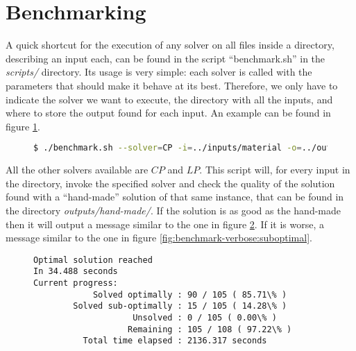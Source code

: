 \section{Benchmarking}
\label{sec:benchmarking}

A quick shortcut for the execution of any solver on all files inside a directory,
describing an input each, can be found in the script ``benchmark.sh''
in the \textit{scripts/} directory. Its usage is very simple: each solver is
called with the parameters that should make it behave at its best. Therefore,
we only have to indicate the solver we want to execute, the directory with
all the inputs, and where to store the output found for each input. An example
can be found in figure \ref{fig:benchmark-example}.

\begin{figure}[H]
\centering
\begin{lstlisting}[language=bash,basicstyle=\centering]
$ ./benchmark.sh --solver=CP -i=../inputs/material -o=../outputs/CP
\end{lstlisting}
\label{fig:benchmark-example}
\end{figure}

All the other solvers available are $CP$ and $LP$. This script will, for every input in the
directory, invoke the specified solver and check the quality of the solution
found with a ``hand-made'' solution of that same instance, that can be found in
the directory \textit{outputs/hand-made/}. If the solution is as good as the
hand-made then it will output a message similar to the one in figure
\ref{fig:benchmark-verbose:optimal}. If it is worse, a message similar to the
one in figure \ref{fig:benchmark-verbose:suboptimal}.

\begin{figure}[H]
\centering
{\scriptsize
\begin{BVerbatim}
Optimal solution reached
In 34.488 seconds
Current progress:
            Solved optimally : 90 / 105 ( 85.71\% )
        Solved sub-optimally : 15 / 105 ( 14.28\% )
                    Unsolved : 0 / 105 ( 0.00\% )
                   Remaining : 105 / 108 ( 97.22\% )
          Total time elapsed : 2136.317 seconds
\end{BVerbatim}
}
\label{fig:benchmark-verbose:optimal}
\end{figure}

